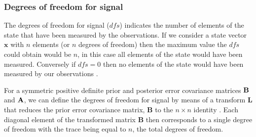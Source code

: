 \subsubsection{Degrees of freedom for signal} \label{chap5:DFSintro}%

The degrees of freedom for signal ($dfs$) indicates the number of elements of the state that have been measured by the observations. If we consider a state vector $\textbf{x}$ with $n$ elements (or $n$ degrees of freedom) then the maximum value the $dfs$ could obtain would be $n$, in this case all elements of the state would have been measured. Conversely if $dfs = 0$ then no elements of the state would have been measured by our observations \citep{Fowler2013}.

For a symmetric positive definite prior and posterior error covariance matrices $\bf{B}$ and $\bf{A}$, we can define the degrees of freedom for signal by means of a transform $\textbf{L}$ that reduces the prior error covariance matrix, $\textbf{B}$ to the $n \times n$ identity \citep{fisher2003estimation}. Each diagonal element of the transformed matrix $\textbf{B}$ then corresponds to a single degree of freedom with the trace being equal to $n$, the total degrees of freedom. 

